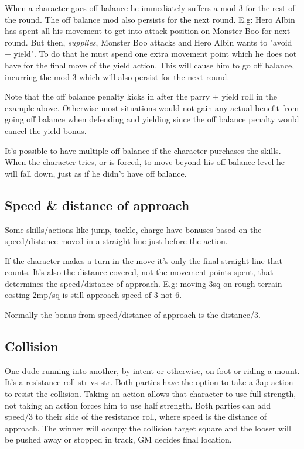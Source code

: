 When a character goes off balance he immediately suffers a mod-3 for the rest of the round. The off balance mod also persists for the next round. E.g: Hero Albin has spent all his movement to get into attack position on Monster Boo for next round. But then, \emph{supplies}, Monster Boo attacks and Hero Albin wants to "avoid + yield". To do that he must spend one extra movement point which he does not have for the final move of the yield action. This will cause him to go off balance, incurring the mod-3 which will also persist for the next round.

Note that the off balance penalty kicks in after the parry + yield roll in the example above. Otherwise most situations would not gain any actual benefit from going off balance when defending and yielding since the off balance penalty would cancel the yield bonus.

It's possible to have multiple off balance if the character purchases the skills.
When the character tries, or is forced, to move beyond his off balance level he will fall down, just as if he didn't have off balance.


\subsection*{Speed \& distance of approach}
\label{sec:approach}
Some skills/actions like jump, tackle, charge have bonuses based on the speed/distance moved in a straight line just before the action.

If the character makes a turn in the move it's only the final straight line that counts. It's also the distance covered, not the movement points spent, that determines the speed/distance of approach. E.g: moving 3sq on rough terrain costing 2mp/sq is still approach speed of 3 not 6.

Normally the bonus from speed/distance of approach is the distance/3.


\subsection*{Collision}
One dude running into another, by intent or otherwise, on foot or riding a mount. It's a resistance roll str vs str.
Both parties have the option to take a 3ap action to resist the collision. Taking an action allows that character to use full strength, not taking an action forces him to use half strength. Both parties can add speed/3 to their side of the resistance roll, where speed is the distance of approach.
The winner will occupy the collision target square and the looser will be pushed away or stopped in track, GM decides final location.


